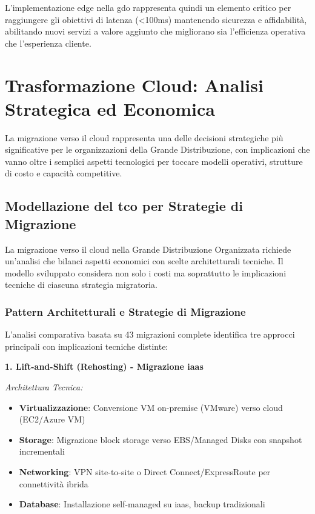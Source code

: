 L'implementazione \gls{edge} nella \gls{gdo} rappresenta quindi un elemento critico per raggiungere gli obiettivi di latenza (<100ms) mantenendo sicurezza e affidabilità, abilitando nuovi servizi a valore aggiunto che migliorano sia l'efficienza operativa che l'esperienza cliente.
\section{\texorpdfstring{\textbf{Trasformazione Cloud: Analisi Strategica ed Economica}}{3.4 - Trasformazione Cloud: Analisi Strategica ed Economica}}

La migrazione verso il cloud rappresenta una delle decisioni strategiche più significative per le organizzazioni della Grande Distribuzione, con implicazioni che vanno oltre i semplici aspetti tecnologici per toccare modelli operativi, strutture di costo e capacità competitive.

\subsection{\texorpdfstring{\textbf{Modellazione del \gls{tco} per Strategie di Migrazione}}{3.4.1 - Modellazione del \gls{tco} per Strategie di Migrazione}}

La migrazione verso il cloud nella Grande Distribuzione Organizzata richiede un'analisi che bilanci aspetti economici con scelte architetturali tecniche. Il modello sviluppato\autocite{KhajehHosseini2024} considera non solo i costi ma soprattutto le implicazioni tecniche di ciascuna strategia migratoria.

\subsubsection{\texorpdfstring{\textbf{Pattern Architetturali e Strategie di Migrazione}}{3.4.1.1 - Pattern Architetturali e Strategie di Migrazione}}

L'analisi comparativa basata su 43 migrazioni complete\autocite{McKinsey2024cloud} identifica tre approcci principali con implicazioni tecniche distinte:

\textbf{1. Lift-and-Shift (Rehosting) - Migrazione \gls{iaas}}

\textit{Architettura Tecnica:}
\begin{itemize}
    \item \textbf{Virtualizzazione}: Conversione VM on-premise (VMware) verso cloud (EC2/Azure VM)
    \item \textbf{Storage}: Migrazione block storage verso EBS/Managed Disks con snapshot incrementali
    \item \textbf{Networking}: VPN site-to-site o Direct Connect/ExpressRoute per connettività ibrida
    \item \textbf{Database}: Installazione self-managed su \gls{iaas}, backup tradizionali
\end{itemize}


